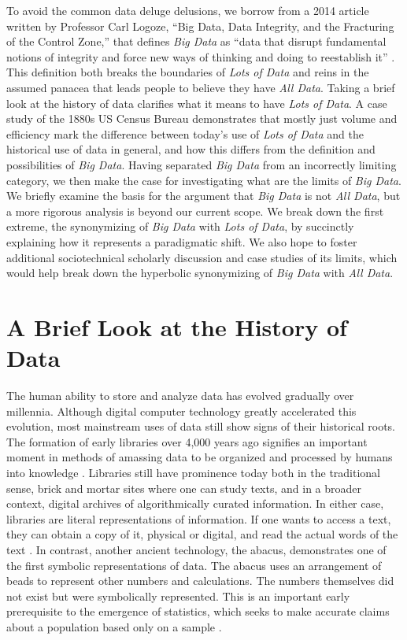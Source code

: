 \documentclass[sigconf]{acmart}
\begin{document}
	To avoid the common data deluge delusions, we borrow from a 2014 article written by Professor Carl Logoze, ``Big Data, Data Integrity, and the Fracturing of the Control Zone,'' that defines {\em Big Data} as ``data that disrupt fundamental notions of integrity and force new ways of thinking and doing to reestablish it'' \cite{Keystone}. This definition both breaks the boundaries of {\em Lots of Data} and reins in the assumed panacea that leads people to believe they have {\em All Data}. Taking a brief look at the history of data clarifies what it means to have {\em Lots of Data}. A case study of the 1880s US Census Bureau demonstrates that mostly just volume and efficiency mark the difference between today's use of {\em Lots of Data} and the historical use of data in general, and how this differs from the definition and possibilities of {\em Big Data}. Having separated {\em Big Data} from an incorrectly limiting category, we then make the case for investigating what are the limits of {\em Big Data}. We briefly examine the basis for the argument that {\em Big Data} is not {\em All Data}, but a more rigorous analysis is beyond our current scope. We break down the first extreme, the synonymizing of {\em Big Data} with {\em Lots of Data}, by succinctly explaining how it represents a paradigmatic shift. We also hope to foster additional sociotechnical scholarly discussion and case studies of its limits, which would help break down the hyperbolic synonymizing of {\em Big Data} with {\em All Data}.

\section{A Brief Look at the History of Data}
The human ability to store and analyze data has evolved gradually over millennia. Although digital computer technology greatly accelerated this evolution, most mainstream uses of data still show signs of their historical roots. The formation of early libraries over 4,000 years ago signifies an important moment in methods of amassing data to be organized and processed by humans into knowledge \cite{Data-History}. Libraries still have prominence today both in the traditional sense, brick and mortar sites where one can study texts, and in a broader context, digital archives of algorithmically curated information. In either case, libraries are literal representations of information. If one wants to access a text, they can obtain a copy of it, physical or digital, and read the actual words of the text \cite{Keystone}. In contrast, another ancient technology, the abacus, demonstrates one of the first symbolic representations of data. The abacus uses an arrangement of beads to represent other numbers and calculations. The numbers themselves did not exist but were symbolically represented. This is an important early prerequisite to the emergence of statistics, which seeks to make accurate claims about a population based only on a sample \cite{Data-History}.
\end{document}
